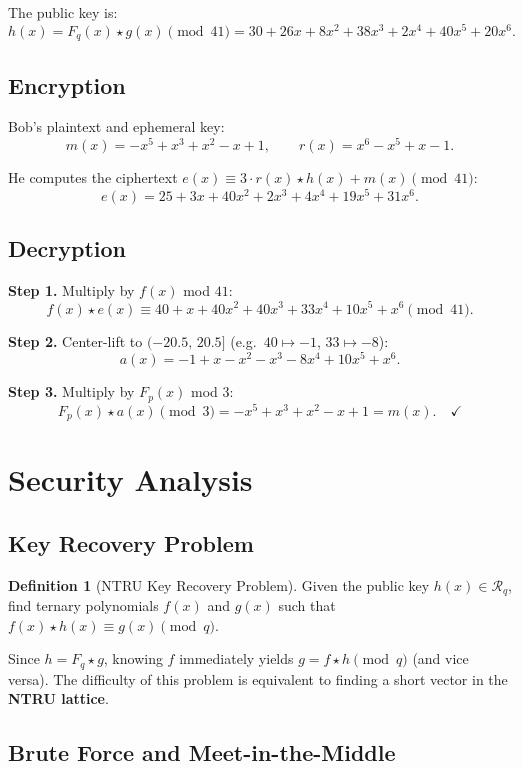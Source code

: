 \documentclass[12pt, a4paper]{article}
\theoremstyle{definition}
\newtheorem{definition}{Definition}[section]
\theoremstyle{plain}
\newcommand{\R}{\mathcal{R}}
\begin{document}
The public key is:
\[
    h(x) = F_q(x) \star g(x) \pmod{41}
         = 30 + 26x + 8x^2 + 38x^3 + 2x^4 + 40x^5 + 20x^6.
\]

\subsection{Encryption}

Bob's plaintext and ephemeral key:
\[
    m(x) = -x^5 + x^3 + x^2 - x + 1, \qquad r(x) = x^6 - x^5 + x - 1.
\]

He computes the ciphertext $e(x) \equiv 3 \cdot r(x) \star h(x) + m(x) \pmod{41}$:
\[
    e(x) = 25 + 3x + 40x^2 + 2x^3 + 4x^4 + 19x^5 + 31x^6.
\]

\subsection{Decryption}

\textbf{Step 1.} Multiply by $f(x)$ mod $41$:
\[
    f(x) \star e(x) \equiv 40 + x + 40x^2 + 40x^3 + 33x^4 + 10x^5 + x^6 \pmod{41}.
\]

\textbf{Step 2.} Center-lift to $(-20.5,\, 20.5]$ (e.g.\ $40 \mapsto -1$,
$33 \mapsto -8$):
\[
    a(x) = -1 + x - x^2 - x^3 - 8x^4 + 10x^5 + x^6.
\]

\textbf{Step 3.} Multiply by $F_p(x)$ mod $3$:
\[
    F_p(x) \star a(x) \pmod{3} = -x^5 + x^3 + x^2 - x + 1 = m(x). \quad \checkmark
\]

\section{Security Analysis}\label{sec:security}

\subsection{Key Recovery Problem}

\begin{definition}[NTRU Key Recovery Problem]
    Given the public key $h(x) \in \R_q$, find ternary polynomials $f(x)$ and
    $g(x)$ such that $f(x) \star h(x) \equiv g(x) \pmod{q}$.
\end{definition}

Since $h = F_q \star g$, knowing $f$ immediately yields $g = f \star h \pmod q$
(and vice versa). The difficulty of this problem is equivalent to finding a
short vector in the \textbf{NTRU lattice}.

\subsection{Brute Force and Meet-in-the-Middle}
\end{document}
